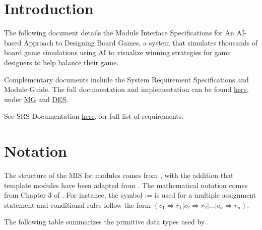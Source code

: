 \documentclass[12pt, titlepage]{article}
\begin{document}
\tableofcontents
\listoftables

\newpage


\section{Introduction}

The following document details the Module Interface Specifications for An AI-based Approach to Designing Board Games, a system that simulates thousands of board game simulations using AI to visualize winning strategies for game designers to help balance their game. 

Complementary documents include the System Requirement Specifications and Module Guide.  The full documentation and implementation can be found \href{https://github.com/Dorps/aiboardgame/tree/main/docs/Design}{here}, under \href{https://github.com/Dorps/aiboardgame/tree/main/docs/Design/MG.pdf}{MG} and \href{https://github.com/Dorps/aiboardgame/tree/main/docs/DES.pdf}{DES}.

See SRS Documentation \href{https://github.com/Dorps/aiboardgame/blob/main/docs/SRS}{here}, for full list of requirements.

\section{Notation}

The structure of the MIS for modules comes from \citet{HoffmanAndStrooper1995},
with the addition that template modules have been adapted from
\cite{GhezziEtAl2003}.  The mathematical notation comes from Chapter 3 of
\citet{HoffmanAndStrooper1995}.  For instance, the symbol := is used for a
multiple assignment statement and conditional rules follow the form $(c_1
\Rightarrow r_1 | c_2 \Rightarrow r_2 | ... | c_n \Rightarrow r_n )$.

The following table summarizes the primitive data types used by \progname. 
\end{document}
